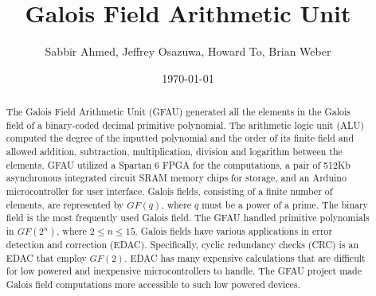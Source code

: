 \documentclass[12pt]{extarticle}
\title{Galois Field Arithmetic Unit}
\author{Sabbir Ahmed, Jeffrey Osazuwa, Howard To, Brian Weber}
\date{\today}
\begin{document}
    \maketitle

    \begin{abstract}

        \large
        The Galois Field Arithmetic Unit (GFAU) generated all the elements in
        the Galois field of a binary-coded decimal primitive polynomial. The
        arithmetic logic unit (ALU) computed the degree of the inputted
        polynomial and the order of its finite field and allowed addition,
        subtraction, multiplication, division and logarithm between the
        elements. GFAU utilized a Spartan 6 FPGA for the computations, a pair
        of 512Kb asynchronous integrated circuit SRAM memory chips for storage,
        and an Arduino microcontroller for user interface. Galois fields,
        consisting of a finite number of elements, are represented by $GF(q)$,
        where $q$ must be a power of a prime. The binary field is the most
        frequently used Galois field. The GFAU handled primitive polynomials in
        $GF(2^n)$, where $2 \le n \le 15$. Galois fields have various
        applications in error detection and correction (EDAC). Specifically,
        cyclic redundancy checks (CRC) is an EDAC that employ $GF(2)$. EDAC has
        many expensive calculations that are difficult for low powered and
        inexpensive microcontrollers to handle. The GFAU project made Galois
        field computations more accessible to such low powered devices.

    \end{abstract}
\end{document}
